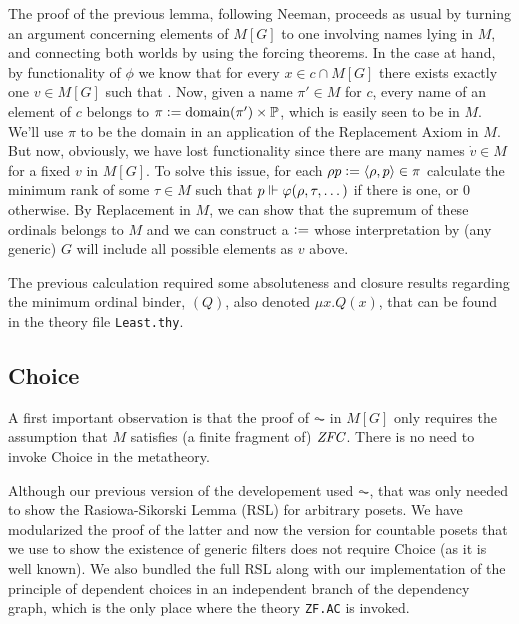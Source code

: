 The proof of the previous lemma, following Neeman, proceeds as usual
by turning an argument concerning elements of $M[G]$ to one involving
names lying in $M$, and connecting both worlds by using the forcing
theorems. In the case at hand, by functionality of $\phi$ we know that
for every $x\in c\cap M[G]$ there exists exactly one $v\in M[G]$ such
that
. Now,
given a name $\pi'\in M$ for $c$, every name of an element of $c$
belongs to $\pi\mathrel{\mathop:}= \operatorname{domain}(\pi')\times \mathbb{P}$, which is easily seen to be
in $M$. We'll use $\pi$ to be the domain in an application of the
Replacement Axiom in $M$. But now, obviously, we have lost
functionality since there are many names $\dot v\in M$ for a fixed $v$
in $M[G]$. To solve this issue, for each $\rho p \mathrel{\mathop:}=\langle\rho,p\rangle\in \pi$ calculate the
minimum rank of some $\tau\in M$ such that 
$p\Vdash \varphi(\rho,\tau,\dots)$ if there is one, or $0$ otherwise. By
Replacement in $M$, we can show that the supremum  of these ordinals
belongs to $M$ and we can construct a  $\mathrel{\mathop:}=$ 
whose interpretation by (any generic) $G$ will include all possible elements
as $v$ above.

The previous calculation required some absoluteness and closure
results regarding the minimum ordinal binder, $(Q)$, also
denoted $\mu x. Q(x)$, that can be found in the theory file
\texttt{Least.thy}.

\subsection{Choice}
A first important observation is that the proof of $\AC$ in $M[G]$
only requires the assumption that $M$ satisfies (a finite fragment of)
$\mathit{ZFC}$. There is no need to invoke Choice in the metatheory.

Although our previous version of the developement used $\AC$, that was
only needed to show the Rasiowa-Sikorski Lemma (RSL) for
arbitrary posets. We have modularized the proof of the latter
and now the version for countable posets that we use to show the
existence of generic filters
does not require Choice (as it is well known). We also bundled the
full RSL along with our implementation of the principle of dependent
choices in an independent branch of the dependency graph, which is the
only place where the theory \texttt{ZF.AC} is invoked.

